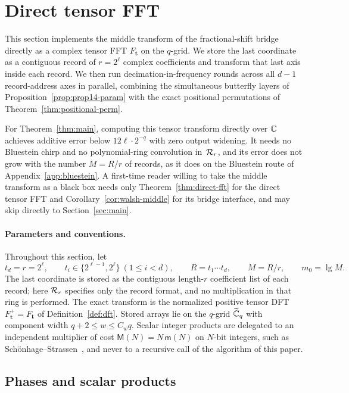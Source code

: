\section{Direct tensor FFT}\label{sec:direct-fft}

This section implements the middle transform of the fractional-shift bridge directly as a complex tensor FFT
$F_{\mathbf t}$ on the $q$-grid. We store the last coordinate as a contiguous record of $r=2^\ell$ complex coefficients
and transform that last axis inside each record. We then run decimation-in-frequency rounds across all $d-1$
record-address axes in parallel, combining the simultaneous butterfly layers of Proposition~\ref{prop:prop14-param} with
the exact positional permutations of Theorem~\ref{thm:positional-perm}.

For Theorem~\ref{thm:main}, computing this
tensor transform directly over $\mathbb{C}$ achieves additive error below $12\ell\cdot 2^{-q}$ with zero output widening. It
needs no Bluestein chirp and no polynomial-ring convolution in~$\mathcal{R}_r$, and its error does not grow with the number
$M=R/r$ of records, as it does on the Bluestein route of Appendix~\ref{app:bluestein}. A first-time
reader willing to take the middle transform as a black box needs only Theorem~\ref{thm:direct-fft} for the direct tensor
FFT and Corollary~\ref{cor:walsh-middle} for its bridge interface, and may skip directly to Section~\ref{sec:main}.

\paragraph{Parameters and conventions.}
Throughout this section, let
\[
  t_d=r=2^\ell,\qquad t_i\in\{2^{\ell-1},2^{\ell}\}\ (1\le i<d),\qquad R=t_1\cdots t_d,\qquad M=R/r,\qquad m_0=\lg M .
\]
The last coordinate is stored as the contiguous length-$r$ coefficient list of each record; here $\mathcal{R}_r$ specifies only
the record format, and no multiplication in that ring is performed. The exact transform is the normalized positive
tensor DFT $F^+_{\mathbf t}=F_{\mathbf t}$ of Definition~\ref{def:dft}. Stored arrays lie on the $q$-grid $\widetilde{\mathbb{C}}_q$ with
component width $q+2\le w\le C_wq$. Scalar integer products are delegated to an independent multiplier of cost
$\mathsf M(N)=N\,\mathsf m(N)$ on $N$-bit integers, such as Sch\"onhage--Strassen~\cite{SS71}, and never to a recursive
call of the algorithm of this paper.

\subsection{Phases and scalar products}\label{sec:direct-fft-phases}

